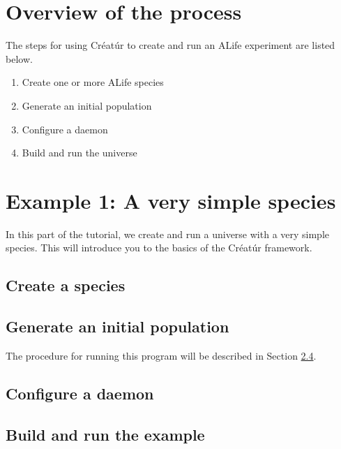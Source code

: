 \documentclass[a4paper,10pt]{article}
\begin{document}
\section{Overview of the process}

The steps for using Créatúr to create and run an ALife experiment
are listed below.

\begin{enumerate}
\item Create one or more ALife species
\item Generate an initial population
\item Configure a daemon
\item Build and run the universe
\end {enumerate}

\section{Example 1: A very simple species}
\label{sec:rock}

In this part of the tutorial, we create and run a universe
with a very simple species.
This will introduce you to the basics of the Créatúr framework.

\subsection{Create a species}
\label{sec:species1}



\subsection{Generate an initial population}
\label{sec:pop1}



The procedure for running this program will be described in Section 
\ref{sec:run1}.

\subsection{Configure a daemon}
\label{sec:daemon1}



\subsection{Build and run the example}
\label{sec:run1}
\end{document}
